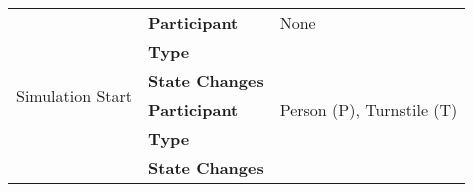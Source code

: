 \setlength{\firstcol}{0.75cm}
\setlength{\secondcol}{0.75cm}
\setlength{\thirdcol}{1.6cm}
\setlength{\fourthcol}{2.5cm}
\setlength{\fifthcol}{9cm}

\begin{tabular}{|p{\thirdcol}|p{\fourthcol}|p{\fifthcol}|}
\hline
  \multirow{9}{*}{\parbox{\thirdcol}{\centering Simulation Start}} &
  \parbox{\fourthcol}{\vspace*{3pt}\centering\textbf{Participant}} &
  None \\  
   &
  \parbox{\fourthcol}{\vspace*{3pt}\centering\textbf{Type}} &
  \\  
   &
  \parbox{\fourthcol}{\vspace*{3pt}\centering\textbf{State Changes}} &
  \hspace*{\algoff}\parbox{\fifthcol}{
  \begin{algorithmic}[1]
      \State
      \State
      \State
      \State
      \State
  \end{algorithmic}
  }  
  \\ \hline
{} &
  \parbox{\fourthcol}{\vspace*{3pt}\centering\textbf{Participant }} &
  Person (P), Turnstile (T) \\  
   &
  \parbox{\fourthcol}{\vspace*{3pt}\centering\textbf{Type }} &
  \\  
   &
  \parbox{\fourthcol}{\vspace*{3pt}\centering\textbf{State Changes }} &
\hspace*{\algoff}\parbox{\fifthcol}{  
  \begin{algorithmic}[1]
    \State 
    \State 
    \State
    \State
  \end{algorithmic}
} \\ \hline
\end{tabular}

